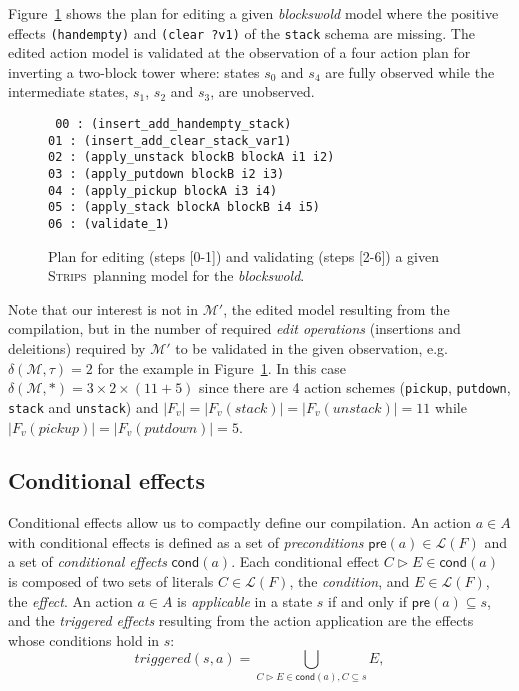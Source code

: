 \documentclass[letterpaper]{article} %
\newcommand{\pre}{\mathsf{pre}}     %
\newcommand{\cond}{\mathsf{cond}}   %
\newcommand{\strips}{\textsc{Strips}}     %
\begin{document}
Figure~\ref{fig:plan-pdistance} shows the plan for editing a given {\em blockswold} model where the positive effects {\tt\small (handempty)} and {\tt\small (clear ?v1)} of the {\tt\small stack} schema are missing. The edited action model is validated at the observation of a four action plan for inverting a two-block tower where: states $s_0$ and $s_4$ are fully observed while the intermediate states, $s_1$, $s_2$ and $s_3$, are unobserved. 
\begin{figure}
{\tt\scriptsize
00 : (insert\_add\_handempty\_stack)\\
01 : (insert\_add\_clear\_stack\_var1)\\
02 : (apply\_unstack blockB blockA i1 i2)\\
03 : (apply\_putdown blockB i2 i3)\\
04 : (apply\_pickup blockA i3 i4)\\
05 : (apply\_stack blockA blockB i4 i5)\\
06 : (validate\_1)
}
 \caption{\small Plan for editing (steps [0-1]) and validating (steps [2-6]) a given \strips\ planning model for the {\em blockswold}.}
\label{fig:plan-pdistance}
\end{figure}

Note that our interest is not in $\mathcal{M}'$, the edited model resulting from the compilation, but in the number of required {\em edit operations} (insertions and deleitions) required by $\mathcal{M}'$ to be validated in the given observation, e.g. $\delta(\mathcal{M},\tau)=2$ for the example in Figure~\ref{fig:plan-pdistance}. In this case $\delta(\mathcal{M},*)=3\times 2\times (11+5)$ since there are 4 action schemes ({\small\tt pickup}, {\small\tt putdown}, {\small\tt stack} and {\small\tt unstack}) and $|F_v|=|F_v(stack)|=|F_v(unstack)|=11$ while $|F_v(pickup)|=|F_v(putdown)|=5$. %


\subsection{Conditional effects}
Conditional effects allow us to compactly define our compilation. An action $a\in A$ with conditional effects is defined as a set of {\em preconditions} $\pre(a)\in\mathcal{L}(F)$ and a set of {\em conditional effects} $\cond(a)$. Each conditional effect $C\rhd E\in\cond(a)$ is composed of two sets of literals $C\in\mathcal{L}(F)$, the {\em condition}, and $E\in\mathcal{L}(F)$, the {\em effect}. An action $a\in A$ is {\em applicable} in a state $s$ if and only if $\pre(a)\subseteq s$, and the {\em triggered effects} resulting from the action application are the effects whose conditions hold in $s$:
\[
triggered(s,a)=\bigcup_{C\rhd E\in\cond(a),C\subseteq s} E,
\]
\end{document}

